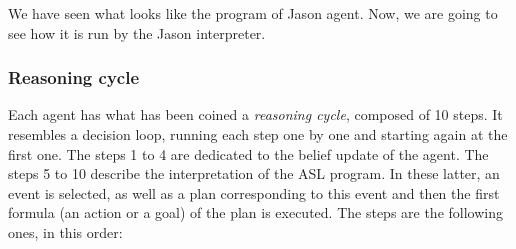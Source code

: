 \documentclass[a4paper,11pt,twoside]{StyleThese}
\begin{document}
We have seen what looks like the program of Jason agent. Now, we are going to see how it is run by the Jason interpreter.


\subsubsection{Reasoning cycle} Each agent has what has been coined a \textit{reasoning cycle}, composed of 10 steps. It resembles a decision loop, running each step one by one and starting again at the first one. The steps 1 to 4 are dedicated to the belief update of the agent. The steps 5 to 10 describe the interpretation of the ASL program. In these latter, an event is selected, as well as a plan corresponding to this event and then the first formula (\eg an action or a goal) of the plan is executed. The steps are the following ones, in this order:
\end{document}
